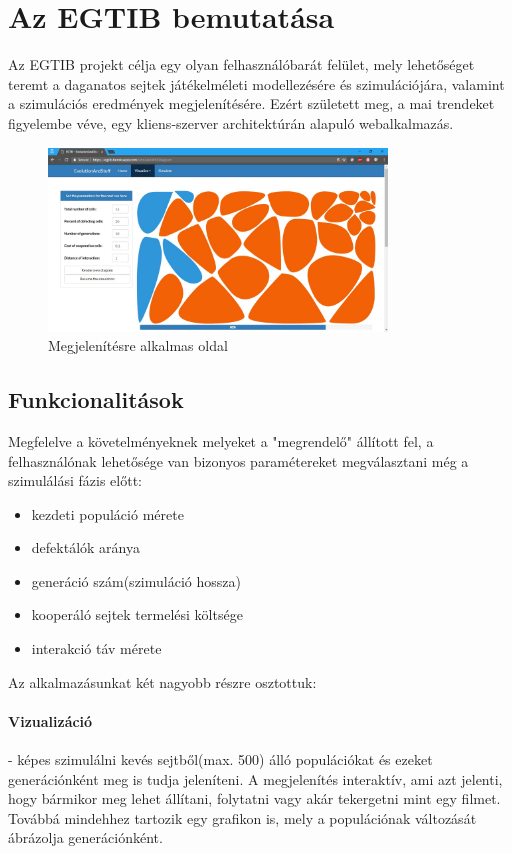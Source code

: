 \newcommand{\projectName}{Az EGTIB}

\section{\projectName{} bemutatása}

\projectName{} projekt célja egy olyan felhasználóbarát felület, mely lehetőséget teremt a daganatos sejtek játékelméleti modellezésére és szimulációjára, valamint a szimulációs eredmények megjelenítésére. Ezért született meg, a mai trendeket figyelembe véve, egy kliens-szerver architektúrán alapuló webalkalmazás.

\begin{figure}[ht!]
	\centering
	\includegraphics[width=90mm]{EGTIB.jpg}
	\caption{Megjelenítésre alkalmas oldal \label{fig:SimulateWithDiagram}}
\end{figure}

\subsection{Funkcionalitások}

Megfelelve a követelményeknek melyeket a "megrendelő" állított fel, a felhasználónak lehetősége van bizonyos paramétereket megválasztani még a szimulálási fázis előtt:
\begin{itemize}[noitemsep]
	\item kezdeti populáció mérete
	\item defektálók aránya 
	\item generáció szám(szimuláció hossza)
	\item kooperáló sejtek termelési költsége 
	\item interakció táv mérete
\end{itemize}

Az alkalmazásunkat két nagyobb részre osztottuk:

\paragraph{Vizualizáció}- képes szimulálni kevés sejtből(max. 500) álló populációkat és ezeket generációnként meg is tudja jeleníteni. A megjelenítés interaktív, ami azt jelenti, hogy bármikor meg lehet állítani, folytatni vagy akár tekergetni mint egy filmet. Továbbá mindehhez tartozik egy grafikon is, mely a populációnak változását ábrázolja generációnként.

